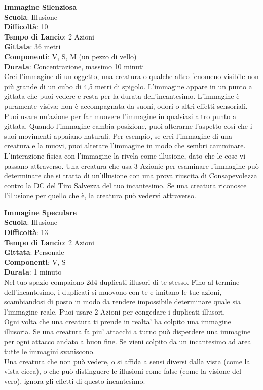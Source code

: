 \begin{multicols}{2}
\medskip\textbf{Immagine Silenziosa}\\
\textbf{Scuola}: Illusione\\
\textbf{Difficoltà}:  10\\
\textbf{Tempo di Lancio}: 2 Azioni\\
\textbf{Gittata}: 36 metri\\
\textbf{Componenti}: V, S, M (un pezzo di vello)\\
\textbf{Durata}: Concentrazione, massimo 10 minuti\\
Crei l’immagine di un oggetto, una creatura o qualche altro fenomeno visibile non più grande di un cubo di 4,5 metri di spigolo. L’immagine appare in un punto a gittata che puoi vedere e resta per la durata dell'incantesimo. L’immagine è puramente visiva; non è accompagnata da suoni, odori o altri effetti sensoriali. Puoi usare un'azione per far muovere l’immagine in qualsiasi altro punto a gittata. Quando l’immagine cambia posizione, puoi alterarne l’aspetto così che i suoi movimenti appaiano naturali. Per esempio, se crei l’immagine di una creatura e la muovi, puoi alterare l’immagine in modo che sembri camminare.\\
L’interazione fisica con l’immagine la rivela come illusione, dato che le cose vi passano attraverso. Una creatura che usa 3 Azionie per esaminare l’immagine può determinare che si tratta di un'illusione con una prova riuscita di Consapevolezza contro la DC del Tiro Salvezza del tuo incantesimo. Se una creatura riconosce l’illusione per quello che è, la creatura può vedervi attraverso.

\medskip\textbf{Immagine Speculare}\\
\textbf{Scuola}: Illusione\\
\textbf{Difficoltà}:  13\\
\textbf{Tempo di Lancio}: 2 Azioni\\
\textbf{Gittata}: Personale\\
\textbf{Componenti}: V, S\\
\textbf{Durata}: 1 minuto\\
Nel tuo spazio compaiono 2d4 duplicati illusori di te stesso. Fino al termine dell'incantesimo, i duplicati si muovono con te e imitano le tue azioni, scambiandosi di posto in modo da rendere impossibile determinare quale sia l’immagine reale. Puoi usare 2 Azioni per congedare i duplicati illusori.\\
Ogni volta che una creatura ti prende in realta' ha colpito una immagine illusoria.
Se una creatura fa piu' attacchi a turno può disperdere una immagine per ogni attacco andato a buon fine. Se vieni colpito da un incantesimo ad area tutte le immagini svaniscono.\\
Una creatura che non può vedere, o si affida a sensi diversi dalla vista (come la vista cieca), o che può  distinguere le illusioni come false (come la visione del vero), ignora gli effetti di questo incantesimo. 


\end{multicols}

